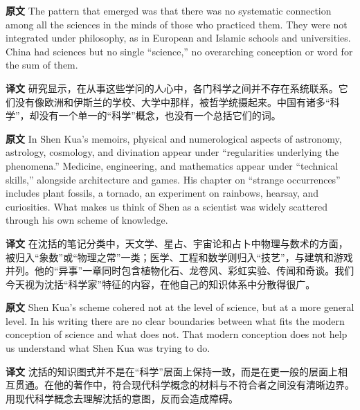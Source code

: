 \documentclass[UTF8,zihao=-4]{ctexart}
\newcommand{\BodyFont}{\fontsize{10.5pt}{15.5pt}\selectfont}
\newcommand{\origlabel}{\textbf{原文}\quad}
\newcommand{\translabel}{\textbf{译文}\quad}
\newenvironment{enblock}{\par\noindent\begingroup\BodyFont\origlabel}{\par\endgroup}
\newenvironment{zhblock}{\par\noindent\begingroup\BodyFont\translabel}{\par\endgroup\vspace{0.35em}}
\begin{document}
\begin{enblock}
The pattern that emerged was that there was no systematic connection among all the sciences in the minds of those who practiced them. They were not integrated under philosophy, as in European and Islamic schools and universities. China had sciences but no single ``science,'' no overarching conception or word for the sum of them.
\end{enblock}
\begin{zhblock}
研究显示，在从事这些学问的人心中，各门科学之间并不存在系统联系。它们没有像欧洲和伊斯兰的学校、大学中那样，被哲学统摄起来。中国有诸多“科学”，却没有一个单一的“科学”概念，也没有一个总括它们的词。
\end{zhblock}

\begin{enblock}
In Shen Kua's memoirs, physical and numerological aspects of astronomy, astrology, cosmology, and divination appear under ``regularities underlying the phenomena.'' Medicine, engineering, and mathematics appear under ``technical skills,'' alongside architecture and games. His chapter on ``strange occurrences'' includes plant fossils, a tornado, an experiment on rainbows, hearsay, and curiosities. What makes us think of Shen as a scientist was widely scattered through his own scheme of knowledge.
\end{enblock}
\begin{zhblock}
在沈括的笔记分类中，天文学、星占、宇宙论和占卜中物理与数术的方面，被归入“象数”或“物理之常”一类；医学、工程和数学则归入“技艺”，与建筑和游戏并列。他的“异事”一章同时包含植物化石、龙卷风、彩虹实验、传闻和奇谈。我们今天视为沈括“科学家”特征的内容，在他自己的知识体系中分散得很广。
\end{zhblock}

\begin{enblock}
Shen Kua's scheme cohered not at the level of science, but at a more general level. In his writing there are no clear boundaries between what fits the modern conception of science and what does not. That modern conception does not help us understand what Shen Kua was trying to do.
\end{enblock}
\begin{zhblock}
沈括的知识图式并不是在“科学”层面上保持一致，而是在更一般的层面上相互贯通。在他的著作中，符合现代科学概念的材料与不符合者之间没有清晰边界。用现代科学概念去理解沈括的意图，反而会造成障碍。
\end{zhblock}
\end{document}
